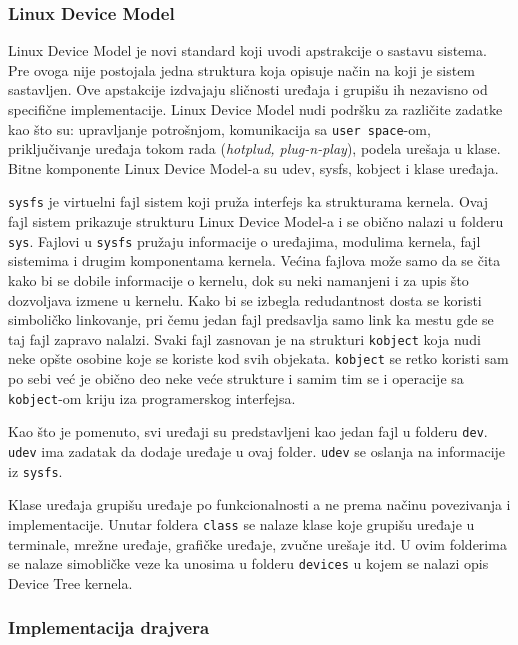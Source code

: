 \subsubsection{Linux Device Model}
Linux Device Model je novi standard koji uvodi apstrakcije o sastavu sistema. Pre ovoga nije postojala jedna struktura koja opisuje način na koji je sistem sastavljen. Ove apstakcije izdvajaju sličnosti uređaja i grupišu ih nezavisno od specifične implementacije. Linux Device Model nudi podršku za različite zadatke kao što su: upravljanje potrošnjom, komunikacija sa \texttt{user space}-om, priključivanje uređaja tokom rada (\textit{hotplud, plug-n-play}), podela urešaja u klase. Bitne komponente Linux Device Model-a su udev, sysfs, kobject i klase uređaja.

\texttt{sysfs} je virtuelni fajl sistem koji pruža interfejs ka strukturama kernela. Ovaj fajl sistem prikazuje strukturu Linux Device Model-a  i se obično nalazi u folderu \texttt{sys}.  Fajlovi u \texttt{sysfs}  pružaju informacije o uređajima, modulima kernela, fajl sistemima i drugim komponentama kernela. Većina fajlova može samo da se čita kako bi se dobile informacije o kernelu, dok su neki namanjeni i za upis što dozvoljava izmene u kernelu. Kako bi se izbegla redudantnost dosta se koristi simboličko linkovanje, pri čemu jedan fajl predsavlja samo link ka mestu gde se taj fajl zapravo nalalzi. Svaki fajl zasnovan je na strukturi \texttt{kobject} koja nudi neke opšte osobine koje se koriste kod svih objekata.  \texttt{kobject} se retko koristi sam po sebi već je obično deo neke veće strukture i samim tim se i operacije sa  \texttt{kobject}-om kriju iza programerskog interfejsa. 

Kao što je pomenuto, svi uređaji su predstavljeni kao jedan fajl u folderu \texttt{dev}. \texttt{udev} ima zadatak da dodaje uređaje u ovaj folder. \texttt{udev} se oslanja na informacije iz \texttt{sysfs}.

Klase uređaja grupišu uređaje po funkcionalnosti a ne prema načinu povezivanja i implementacije. Unutar foldera \texttt{class} se nalaze klase koje grupišu uređaje u terminale, mrežne uređaje, grafičke uređaje, zvučne urešaje itd. U ovim folderima se nalaze simobličke veze ka unosima u folderu \texttt{devices} u kojem se nalazi opis Device Tree kernela. 

\subsubsection{Implementacija drajvera}

